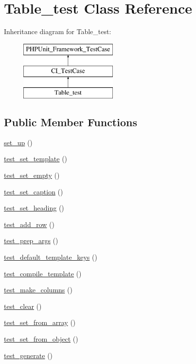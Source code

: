 \hypertarget{class_table__test}{}\section{Table\+\_\+test Class Reference}
\label{class_table__test}
Inheritance diagram for Table\+\_\+test\+:\begin{figure}[H]
\begin{center}
\leavevmode
\includegraphics[height=3.000000cm]{class_table__test}
\end{center}
\end{figure}
\subsection*{Public Member Functions}
\begin{DoxyCompactItemize}
\item 
\hyperlink{class_table__test_a69829875c8d4b6ce94908445c4155741}{set\+\_\+up} ()
\item 
\hyperlink{class_table__test_a65d3335b3a495033fe2228f67c7449ac}{test\+\_\+set\+\_\+template} ()
\item 
\hyperlink{class_table__test_a3d1d3ed618027ef9f5d2fbb5920d982f}{test\+\_\+set\+\_\+empty} ()
\item 
\hyperlink{class_table__test_a221e8d4be1b7bf9f010ef972f0ef1a2a}{test\+\_\+set\+\_\+caption} ()
\item 
\hyperlink{class_table__test_ae0288b67c9abe8e814d9f3b3ba5e7f24}{test\+\_\+set\+\_\+heading} ()
\item 
\hyperlink{class_table__test_a68bdffe458bce60f72afb833eaa46124}{test\+\_\+add\+\_\+row} ()
\item 
\hyperlink{class_table__test_a857b3605e94ae7c2b2b132b7497b1ddd}{test\+\_\+prep\+\_\+args} ()
\item 
\hyperlink{class_table__test_aaade6f72e44910ecb7b07a17510ba9d4}{test\+\_\+default\+\_\+template\+\_\+keys} ()
\item 
\hyperlink{class_table__test_a2324f8070abcbbe5550a35a945a750ce}{test\+\_\+compile\+\_\+template} ()
\item 
\hyperlink{class_table__test_a8716c77db62e2aec4285bc67115762c5}{test\+\_\+make\+\_\+columns} ()
\item 
\hyperlink{class_table__test_a5f9bb6efc26f95bca70d541093427723}{test\+\_\+clear} ()
\item 
\hyperlink{class_table__test_a13d040bb453884e850470f93e5be1071}{test\+\_\+set\+\_\+from\+\_\+array} ()
\item 
\hyperlink{class_table__test_a5f95c5be54ce0a034f9b5e4887c098ee}{test\+\_\+set\+\_\+from\+\_\+object} ()
\item 
\hyperlink{class_table__test_ace0c2e39632dd4ab90d87a608c1ec5d6}{test\+\_\+generate} ()
\end{DoxyCompactItemize}
